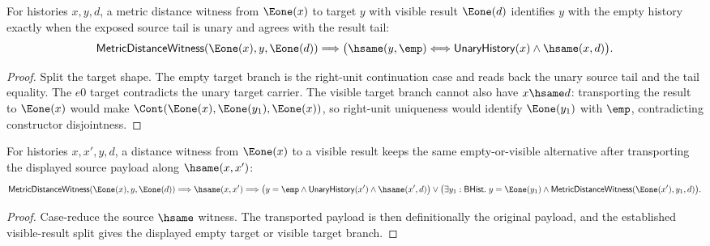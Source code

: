 \begin{theorem}
\label{thm:metric-distance-witness-left-e1-result-empty-target-iff}
For histories $x,y,d$, a metric distance witness from $\Eone(x)$ to target
$y$ with visible result $\Eone(d)$ identifies $y$ with the empty history
exactly when the exposed source tail is unary and agrees with the result tail:
$$
\mathsf{MetricDistanceWitness}(\Eone(x),y,\Eone(d))
\Longrightarrow
\bigl(\hsame(y,\emp)\Longleftrightarrow
\mathsf{UnaryHistory}(x)\land\hsame(x,d)\bigr).
$$
\end{theorem}
\begin{proof}
Split the target shape. The empty target branch is the right-unit continuation
case and reads back the unary source tail and the tail equality. The \(e0\)
target contradicts the unary target carrier. The visible target branch cannot
also have \(x\hsame d\): transporting the result to \(\Eone(x)\) would make
\(\Cont(\Eone(x),\Eone(y_1),\Eone(x))\), so right-unit uniqueness would
identify \(\Eone(y_1)\) with \(\emp\), contradicting constructor
disjointness.
\end{proof}

\begin{theorem}
\label{thm:metric-distance-witness-left-e1-result-hsame-source}
For histories $x,x',y,d$, a distance witness from $\Eone(x)$ to a visible
result keeps the same empty-or-visible alternative after transporting the
displayed source payload along $\hsame(x,x')$:
$$
\mathsf{MetricDistanceWitness}(\Eone(x),y,\Eone(d))
\Longrightarrow
\hsame(x,x')
\Longrightarrow
\bigl(y=\emp\land\mathsf{UnaryHistory}(x')\land\hsame(x',d)\bigr)
\lor
\bigl(\exists y_1:\mathsf{BHist}.\;
y=\Eone(y_1)\land
\mathsf{MetricDistanceWitness}(\Eone(x'),y_1,d)\bigr).
$$
\end{theorem}
\begin{proof}
Case-reduce the source $\hsame$ witness. The transported payload is then
definitionally the original payload, and the established visible-result split
gives the displayed empty target or visible target branch.
\end{proof}

